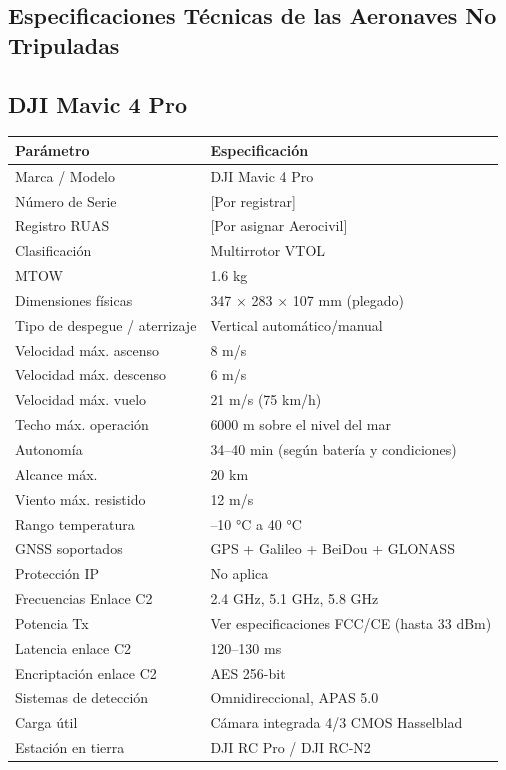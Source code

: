 
\subsection{Especificaciones Técnicas de las Aeronaves No Tripuladas}

\subsection*{DJI Mavic 4 Pro}
\begin{tabular}{|p{6cm}|p{8cm}|}
\hline
\textbf{Parámetro} & \textbf{Especificación} \\ \hline
Marca / Modelo & DJI Mavic 4 Pro \\ \hline
Número de Serie & [Por registrar] \\ \hline
Registro RUAS & [Por asignar Aerocivil] \\ \hline
Clasificación & Multirrotor VTOL \\ \hline
MTOW & 1.6 kg  \\ \hline
Dimensiones físicas & 347 × 283 × 107 mm (plegado) \\ \hline
Tipo de despegue / aterrizaje & Vertical automático/manual \\ \hline
Velocidad máx. ascenso & 8 m/s \\ \hline
Velocidad máx. descenso & 6 m/s \\ \hline
Velocidad máx. vuelo & 21 m/s (75 km/h) \\ \hline
Techo máx. operación & 6000 m sobre el nivel del mar \\ \hline
Autonomía & 34–40 min (según batería y condiciones) \\ \hline
Alcance máx. & 20 km  \\ \hline
Viento máx. resistido & 12 m/s \\ \hline
Rango temperatura & –10 °C a 40 °C \\ \hline
GNSS soportados & GPS + Galileo + BeiDou + GLONASS \\ \hline
Protección IP & No aplica \\ \hline
Frecuencias Enlace C2 & 2.4 GHz, 5.1 GHz, 5.8 GHz \\ \hline
Potencia Tx & Ver especificaciones FCC/CE (hasta 33 dBm) \\ \hline
Latencia enlace C2 & 120–130 ms \\ \hline
Encriptación enlace C2 & AES 256-bit \\ \hline
Sistemas de detección & Omnidireccional, APAS 5.0 \\ \hline
Carga útil & Cámara integrada 4/3 CMOS Hasselblad \\ \hline
Estación en tierra & DJI RC Pro / DJI RC-N2 \\ \hline
\end{tabular}





